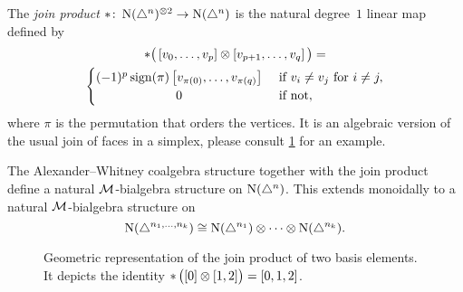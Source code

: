 The \textit{join product} $\ast \colon \operatorname{N}(\triangle^n)^{\otimes 2} \to \operatorname{N}(\triangle^n)$ is the natural degree~$1$ linear map defined by
\begin{multline}
\ast \big(\left[v_0, \dots, v_p \right] \ot \left[v_{p+1}, \dots, v_q\right]\big) = \\
\begin{cases} (-1)^{p} \sign(\pi) \left[v_{\pi(0)}, \dots, v_{\pi(q)}\right] & \text{ if } v_i \neq v_j \text{ for } i \neq j, \\
\hfil 0 & \text{ if not}, \end{cases}
\end{multline}
where $\pi$ is the permutation that orders the vertices.
It is an algebraic version of the usual join of faces in a simplex, please consult \cref{f:join of faces} for an example.

The Alexander--Whitney coalgebra structure together with the join product define a natural $\mathcal{M}$-bialgebra structure on $\operatorname{N}(\triangle^n)$. This extends monoidally to a natural $\mathcal{M}$-bialgebra structure on
\[
\operatorname{N}(\triangle^{n_1, \dots, n_k}) \cong
\operatorname{N}(\triangle^{n_1}) \otimes \dotsb \otimes \operatorname{N}(\triangle^{n_k}).
\]

\begin{figure}
	
	\caption{Geometric representation of the join product of two basis elements. It depicts the identity $\operatorname{\ast} \big( [0] \otimes [1,2] \big) = [0,1,2]$.}
	\label{f:join of faces}
\end{figure}